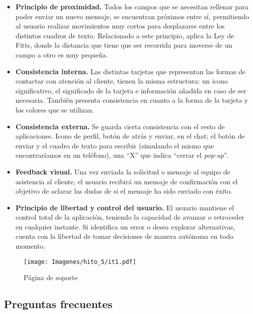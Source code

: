 \begin{itemize}
    \item \textbf{Principio de proximidad.} Todos los campos que se necesitan rellenar para poder enviar un nuevo
        mensaje, se encuentran próximos entre sí, permitiendo al usuario realizar movimientos muy cortos para
        desplazarse entre los distintos cuadros de texto. Relacionado a este principio, aplica la Ley de Fitts,
        donde la distancia que tiene que ser recorrida para moverse de un campo a otro es muy pequeña.
    \item \textbf{Consistencia interna.} Las distintas tarjetas que representan las formas de contactar con atención
        al cliente, tienen la misma estructura: un icono significativo, el significado de la tarjeta e información
        añadida en caso de ser necesaria. También presenta consistencia en cuanto a la forma de la tarjeta y los
        colores que se utilizan.
    \item \textbf{Consistencia externa.} Se guarda cierta consistencia con el resto de aplicaciones. Icono de
        perfil, botón de atrás y enviar, en el chat; el botón de enviar y el cuadro de texto para escribir (simulando
        el mismo que encontraríamos en un teléfono), una “X” que indica “cerrar el \textit{pop-up}”.
    \item \textbf{Feedback visual.} Una vez enviada la solicitud o mensaje al equipo de asistencia al cliente, el
        usuario recibirá un mensaje de confirmación con el objetivo de aclarar las dudas de si el mensaje ha sido
        enviado con éxito.
    \item \textbf{Principio de libertad y control del usuario.} El usuario mantiene el control total de la aplicación,
        teniendo la capacidad de avanzar o retroceder en cualquier instante. Si identifica un error o desea
        explorar alternativas, cuenta con la libertad de tomar decisiones de manera autónoma en todo momento.

\end{itemize}

\begin{figure}[H]
    \centering
    \texttt{[image: Imagenes/hito\_5/it1.pdf]}
    \caption{Página de soporte}
    \label{fig:it1_soporte}
\end{figure}

\subsection*{Preguntas frecuentes}

